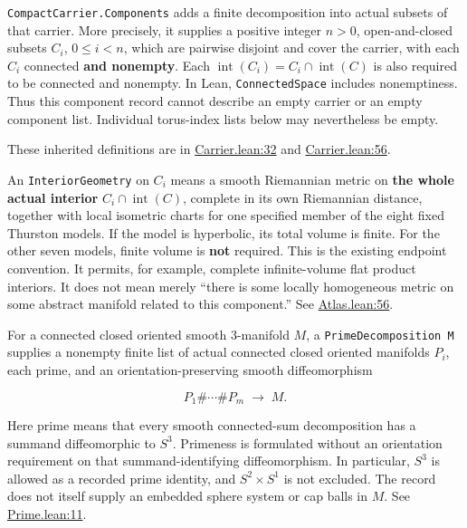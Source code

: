 \documentclass[
  letterpaper,
  11pt]{article}
\begin{document}
{\small\texttt{Compact\allowbreak{}Carrier.\allowbreak{}Components}}
adds a finite decomposition into actual subsets of that carrier. More
precisely, it supplies a positive integer \(n>0\), open-and-closed
subsets \(C_i\), \(0\leq i<n\), which are pairwise disjoint and cover
the carrier, with each \(C_i\) connected \textbf{and nonempty}. Each
\(\operatorname{int}(C_i)=C_i\cap\operatorname{int}(C)\) is also
required to be connected and nonempty. In Lean,
{\small\texttt{Connected\allowbreak{}Space}} includes nonemptiness. Thus
this component record cannot describe an empty carrier or an empty
component list. Individual torus-index lists below may nevertheless be
empty.

These inherited definitions are in
\href{https://github.com/qinz1yang/differential-geometry-dev/blob/ea0fae60ee01ef8c8d9b57a51794c6538f679c5d/DifferentialGeometry/Topology/ThreeManifold/Geometrization/Carrier.lean\#L32}{Carrier.lean:32}
and
\href{https://github.com/qinz1yang/differential-geometry-dev/blob/ea0fae60ee01ef8c8d9b57a51794c6538f679c5d/DifferentialGeometry/Topology/ThreeManifold/Geometrization/Carrier.lean\#L56}{Carrier.lean:56}.

An {\small\texttt{Interior\allowbreak{}Geometry}} on \(C_i\) means a
smooth Riemannian metric on \textbf{the whole actual interior}
\(C_i\cap\operatorname{int}(C)\), complete in its own Riemannian
distance, together with local isometric charts for one specified member
of the eight fixed Thurston models. If the model is hyperbolic, its
total volume is finite. For the other seven models, finite volume is
\textbf{not} required. This is the existing endpoint convention. It
permits, for example, complete infinite-volume flat product interiors.
It does not mean merely ``there is some locally homogeneous metric on
some abstract manifold related to this component.'' See
\href{https://github.com/qinz1yang/differential-geometry-dev/blob/ea0fae60ee01ef8c8d9b57a51794c6538f679c5d/DifferentialGeometry/Geometry/Thurston/Atlas.lean\#L56}{Atlas.lean:56}.

For a connected closed oriented smooth 3-manifold \(M\), a
{\small\texttt{Prime\allowbreak{}Decomposition M}} supplies a nonempty
finite list of actual connected closed oriented manifolds \(P_i\), each
prime, and an orientation-preserving smooth diffeomorphism

\[
       P_1\#\cdots\#P_m\;\longrightarrow\;M.
\]

Here prime means that every smooth connected-sum decomposition has a
summand diffeomorphic to \(S^3\). Primeness is formulated without an
orientation requirement on that summand-identifying diffeomorphism. In
particular, \(S^3\) is allowed as a recorded prime identity, and
\(S^2\times S^1\) is not excluded. The record does not itself supply an
embedded sphere system or cap balls in \(M\). See
\href{https://github.com/qinz1yang/differential-geometry-dev/blob/ea0fae60ee01ef8c8d9b57a51794c6538f679c5d/DifferentialGeometry/Topology/ThreeManifold/Geometrization/Prime.lean\#L11}{Prime.lean:11}.
\end{document}
